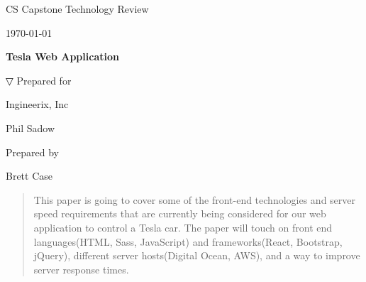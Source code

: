 \documentclass[onecolumn, draftclsnofoot,10pt, compsoc]{IEEEtran}
\def \CapstoneTeamName{                 The Ingineers}
\def \CapstoneTeamNumber{               22}
\def \GroupMemberOne{                   Brett Case}
\def \GroupMemberTwo{                   Alexander Morefield}
\def \GroupMemberThree{                 James Zeng}
\def \GroupMemberFour{                  Christopher Jansen}
\def \GroupMemberFive{                  Burton Jaursch}
\def \CapstoneProjectName{              Tesla Web Application}
\def \CapstoneSponsorCompany{           Ingineerix, Inc}
\def \CapstoneSponsorPerson{            Phil Sadow}
\def \DocType{                  %
                                Technology Review
                                }
\newcommand{\NameSigPair}[1]{\par
\makebox[2.75in][r]{#1} \hfil   \makebox[3.25in]{\makebox[2.25in]{\hrulefill} \hfill            \makebox[.75in]{\hrulefill}}
\par\vspace{-12pt} \textit{\tiny\noindent
\makebox[2.75in]{} \hfil                \makebox[3.25in]{\makebox[2.25in][r]{Signature} \hfill  \makebox[.75in][r]{Date}}}}
\renewcommand{\NameSigPair}[1]{#1}
\begin{document}
\begin{titlepage}
    \begin{singlespace}
        \hfill
        \par\vspace{.2in}
        \centering
        \scshape{
            \huge CS Capstone \DocType \par
            {\large\today}\par
            \vspace{.5in}
            \textbf{\Huge\CapstoneProjectName}\par
            \vfill

▽
            \vfill
            {\large Prepared for}\par
            \Huge \CapstoneSponsorCompany\par
            \vspace{5pt}
            {\Large\NameSigPair{\CapstoneSponsorPerson}\par}
            {\large Prepared by }\par
            \vspace{5pt}
            {\Large
                \NameSigPair{\GroupMemberOne}\par
            }
            \vspace{20pt}
        }
        \begin{abstract}
        This paper is going to cover some of the front-end technologies and server speed requirements that are currently being considered for our web application to control a Tesla car. The paper will touch on front end languages(HTML, Sass, JavaScript) and frameworks(React, Bootstrap, jQuery), different server hosts(Digital Ocean, AWS), and a way to improve server response times.
        \end{abstract}
    \end{singlespace}
\end{titlepage}
\newpage
{}
\tableofcontents
\clearpage
\end{document}
